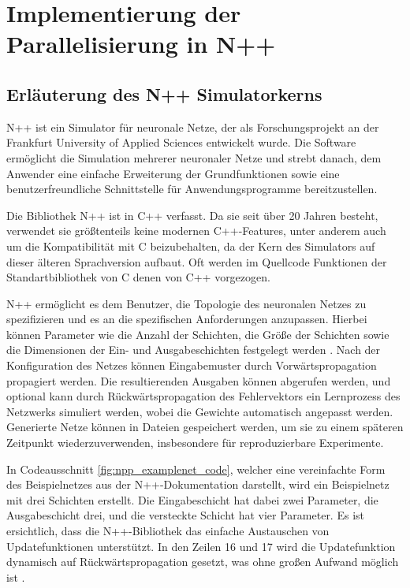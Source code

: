 \chapter{Implementierung der Parallelisierung in N++}
\label{ch:Implementierung_Parallelisierung_Npp}

\section{Erläuterung des N++ Simulatorkerns}
\label{sec:Erlauterung_Npp}
N++ ist ein Simulator für neuronale Netze, der als Forschungsprojekt an der Frankfurt University of Applied Sciences entwickelt wurde. Die Software ermöglicht die Simulation mehrerer neuronaler Netze und strebt danach, dem Anwender eine einfache Erweiterung der Grundfunktionen sowie eine benutzerfreundliche Schnittstelle für Anwendungsprogramme bereitzustellen.

Die Bibliothek N++ ist in C++ verfasst. Da sie seit über 20 Jahren besteht, verwendet sie größtenteils keine modernen C++-Features, unter anderem auch um die Kompatibilität mit C beizubehalten, da der Kern des Simulators auf dieser älteren Sprachversion aufbaut. Oft werden im Quellcode Funktionen der Standartbibliothek von C denen von C++ vorgezogen.

N++ ermöglicht es dem Benutzer, die Topologie des neuronalen Netzes zu spezifizieren und es an die spezifischen Anforderungen anzupassen. Hierbei können Parameter wie die Anzahl der Schichten, die Größe der Schichten sowie die Dimensionen der Ein- und Ausgabeschichten festgelegt werden \citep{dokumentation_n++}. Nach der Konfiguration des Netzes können Eingabemuster durch Vorwärtspropagation propagiert werden. Die resultierenden Ausgaben können abgerufen werden, und optional kann durch Rückwärtspropagation des Fehlervektors ein Lernprozess des Netzwerks simuliert werden, wobei die Gewichte automatisch angepasst werden. Generierte Netze können in Dateien gespeichert werden, um sie zu einem späteren Zeitpunkt wiederzuverwenden, insbesondere für reproduzierbare Experimente.

In Codeausschnitt \ref{fig:npp_examplenet_code}, welcher eine vereinfachte Form des Beispielnetzes aus der N++-Dokumentation darstellt, wird ein Beispielnetz mit drei Schichten erstellt. Die Eingabeschicht hat dabei zwei Parameter, die Ausgabeschicht drei, und die versteckte Schicht hat vier Parameter. Es ist ersichtlich, dass die N++-Bibliothek das einfache Austauschen von Updatefunktionen unterstützt. In den Zeilen 16 und 17 wird die Updatefunktion dynamisch auf Rückwärtspropagation gesetzt, was ohne großen Aufwand möglich ist \citep{dokumentation_n++}.

